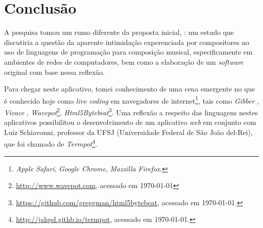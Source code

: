 \chapter*[Conclusão]{Conclusão}\label{conclusao}

A pesquisa tomou um rumo diferente da proposta inicial, : um estudo que discutiria a questão da aparente intimidação experenciada por compositores no uso de linguagens de programação para composição musical, especificamente em ambientes de redes de computadores, bem como a elaboração de um \emph{software} original com base nessa reflexão. 

Para chegar neste aplicativo, tomei conhecimento de uma cena emergente no que é conhecido hoje como \emph{live coding} em navegadores de internet\footnote{\emph{Apple Safari}, \emph{Google Chrome}, \emph{Mozzilla Firefox}.}, tais como \emph{Gibber} \cite{roberts_gibber:_2012}, \emph{Vivace} \cite{vieira_vivace:_2015}, \emph{Wavepot}\footnote{\url{http://www.wavepot.com}, acessado em \today}, \emph{Html5Bytebeat}\footnote{\url{https://github.com/greggman/html5bytebeat}, acessado em \today.}. Uma reflexão a respeito das linguagens nestes aplicativos possibilitou o desenvolvimento de um aplicativo \emph{web} em conjunto com Luíz Schiavonni, professor da UFSJ (Universidade Federal de São João del-Rei), que foi chamado de \emph{Termpot}\footnote{\url{http://jahpd.githb.io/termpot}, acessado em \today.}. 

